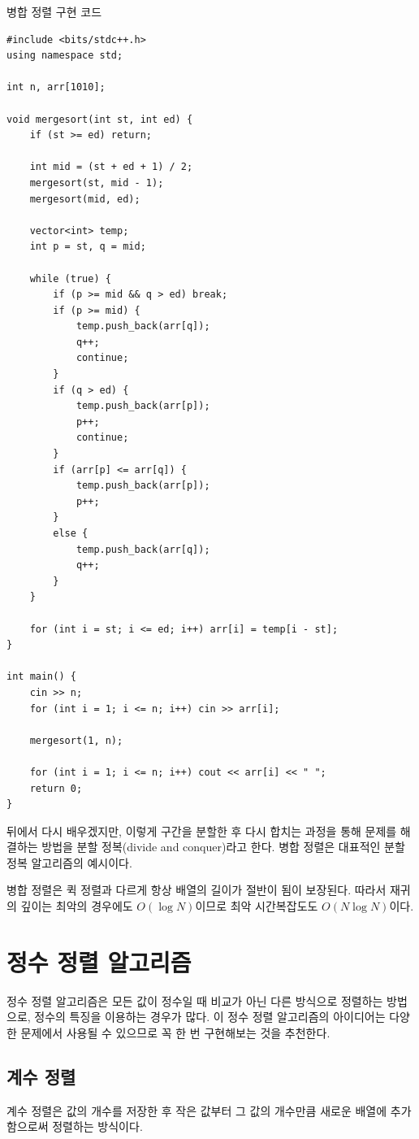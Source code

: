 \begin{code} \label{code: mergesort}
병합 정렬 구현 코드
\begin{lstlisting}
#include <bits/stdc++.h>
using namespace std;

int n, arr[1010];

void mergesort(int st, int ed) {
    if (st >= ed) return;

    int mid = (st + ed + 1) / 2;
    mergesort(st, mid - 1);
    mergesort(mid, ed);

    vector<int> temp;
    int p = st, q = mid;

    while (true) {
        if (p >= mid && q > ed) break;
        if (p >= mid) {
            temp.push_back(arr[q]);
            q++;
            continue;
        }
        if (q > ed) {
            temp.push_back(arr[p]);
            p++;
            continue;
        }
        if (arr[p] <= arr[q]) {
            temp.push_back(arr[p]);
            p++;
        }
        else {
            temp.push_back(arr[q]);
            q++;
        }
    }

    for (int i = st; i <= ed; i++) arr[i] = temp[i - st];
}

int main() {
    cin >> n;
    for (int i = 1; i <= n; i++) cin >> arr[i];

    mergesort(1, n);

    for (int i = 1; i <= n; i++) cout << arr[i] << " ";
    return 0;
}

\end{lstlisting}
\end{code}

뒤에서 다시 배우겠지만, 이렇게 구간을 분할한 후 다시 합치는 과정을 통해 문제를 해결하는 방법을 분할 정복(divide and conquer)라고 한다. 병합 정렬은 대표적인 분할 정복 알고리즘의 예시이다.

병합 정렬은 퀵 정렬과 다르게 항상 배열의 길이가 절반이 됨이 보장된다. 따라서 재귀의 깊이는 최악의 경우에도 $O(\log N)$이므로 최악 시간복잡도도 $O(N \log N)$이다.

\section{정수 정렬 알고리즘}
정수 정렬 알고리즘은 모든 값이 정수일 때 비교가 아닌 다른 방식으로 정렬하는 방법으로, 정수의 특징을 이용하는 경우가 많다. 이 정수 정렬 알고리즘의 아이디어는 다양한 문제에서 사용될 수 있으므로 꼭 한 번 구현해보는 것을 추천한다.

\subsection{계수 정렬}
계수 정렬은 값의 개수를 저장한 후 작은 값부터 그 값의 개수만큼 새로운 배열에 추가함으로써 정렬하는 방식이다.

